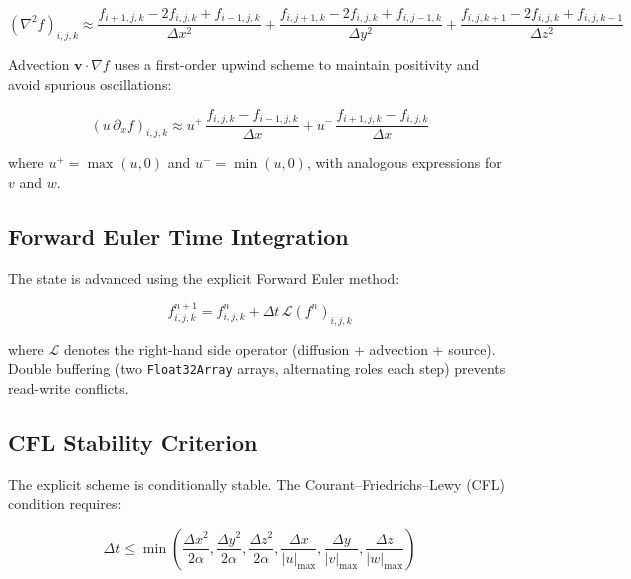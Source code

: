 \documentclass[12pt,a4paper]{report}
\begin{document}
\begin{equation}
  (\nabla^2 f)_{i,j,k} \approx \frac{f_{i+1,j,k} - 2f_{i,j,k} + f_{i-1,j,k}}{\Delta x^2}
  + \frac{f_{i,j+1,k} - 2f_{i,j,k} + f_{i,j-1,k}}{\Delta y^2}
  + \frac{f_{i,j,k+1} - 2f_{i,j,k} + f_{i,j,k-1}}{\Delta z^2}
  \label{eq:laplacian}
\end{equation}

Advection $\mathbf{v}\cdot\nabla f$ uses a first-order upwind scheme to maintain positivity and avoid spurious oscillations:

\begin{equation}
  (u\,\partial_x f)_{i,j,k} \approx
  u^+\,\frac{f_{i,j,k} - f_{i-1,j,k}}{\Delta x} + u^-\,\frac{f_{i+1,j,k} - f_{i,j,k}}{\Delta x}
  \label{eq:upwind}
\end{equation}

where $u^+ = \max(u,0)$ and $u^- = \min(u,0)$, with analogous expressions for $v$ and $w$.

\subsection{Forward Euler Time Integration}
\label{subsec:euler}

The state is advanced using the explicit Forward Euler method:

\begin{equation}
  f^{n+1}_{i,j,k} = f^n_{i,j,k} + \Delta t\,\mathcal{L}(f^n)_{i,j,k}
  \label{eq:euler}
\end{equation}

where $\mathcal{L}$ denotes the right-hand side operator (diffusion + advection + source). Double buffering (two \texttt{Float32Array} arrays, alternating roles each step) prevents read-write conflicts.

\subsection{CFL Stability Criterion}
\label{subsec:cfl}

The explicit scheme is conditionally stable. The Courant--Friedrichs--Lewy (CFL) condition \cite{courant1928} requires:

\begin{equation}
  \Delta t \leq \min\!\left(\frac{\Delta x^2}{2\alpha}, \frac{\Delta y^2}{2\alpha}, \frac{\Delta z^2}{2\alpha},
  \frac{\Delta x}{|u|_\text{max}}, \frac{\Delta y}{|v|_\text{max}}, \frac{\Delta z}{|w|_\text{max}}\right)
  \label{eq:cfl}
\end{equation}
\end{document}
